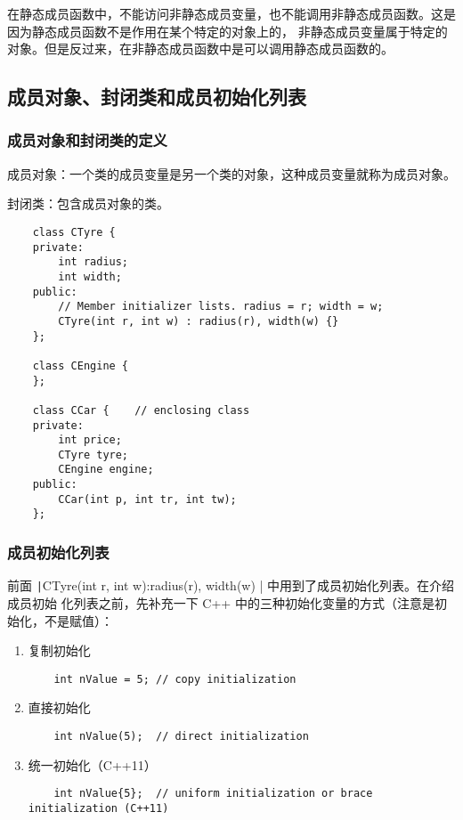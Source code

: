 \documentclass[UTF8]{ctexart}
\begin{document}
在静态成员函数中，不能访问非静态成员变量，也不能调用非静态成员函数。这是因为静态成员函数不是作用在某个特定的对象上的，
非静态成员变量属于特定的对象。但是反过来，在非静态成员函数中是可以调用静态成员函数的。

\subsection{成员对象、封闭类和成员初始化列表}
\subsubsection{成员对象和封闭类的定义}
成员对象：一个类的成员变量是另一个类的对象，这种成员变量就称为成员对象。

封闭类：包含成员对象的类。
\begin{verbatim}
    class CTyre {
    private:
        int radius;
        int width;
    public:
        // Member initializer lists. radius = r; width = w;
        CTyre(int r, int w) : radius(r), width(w) {}
    };

    class CEngine {
    };

    class CCar {    // enclosing class
    private:
        int price;
        CTyre tyre;
        CEngine engine;
    public:
        CCar(int p, int tr, int tw);
    };
\end{verbatim}

\subsubsection{成员初始化列表}
前面 \texttt|CTyre(int r, int w):radius(r), width(w) {}| 中用到了成员初始化列表。在介绍成员初始
化列表之前，先补充一下 C++ 中的三种初始化变量的方式（注意是初始化，不是赋值）：
\begin{enumerate}
    \item 复制初始化
    \begin{verbatim}
    int nValue = 5; // copy initialization
    \end{verbatim}
    \item 直接初始化
    \begin{verbatim}
    int nValue(5);  // direct initialization
    \end{verbatim}
    \item 统一初始化（C++11）
    \begin{verbatim}
    int nValue{5};  // uniform initialization or brace initialization (C++11)
    \end{verbatim}
\end{enumerate}
\end{document}
